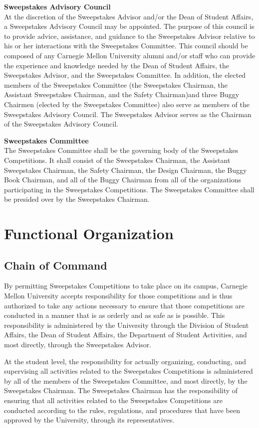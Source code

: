 \textbf{Sweepstakes Advisory Council}\\
At the discretion of the Sweepstakes Advisor and/or the Dean of Student Affairs, a Sweepstakes Advisory Council may be appointed. The purpose of this council is to provide advice, assistance, and guidance to the Sweepstakes Advisor relative to his or her interactions with the Sweepstakes Committee. This council should be composed of any Carnegie Mellon University alumni and/or staff who can provide the experience and knowledge needed by the Dean of Student Affairs, the Sweepstakes Advisor, and the Sweepstakes Committee. In addition, the elected members of the Sweepstakes Committee (the Sweepstakes Chairman, the Assistant Sweepstakes Chairman, and the Safety Chairman)and three Buggy Chairmen (elected by the Sweepstakes Committee) also serve as members of the Sweepstakes Advisory Council. The Sweepstakes Advisor serves as the Chairman of the Sweepstakes Advisory Council.

\textbf{Sweepstakes Committee}\\
The Sweepstakes Committee shall be the governing body of the Sweepstakes Competitions. It shall consist of the Sweepstakes Chairman, the Assistant Sweepstakes Chairman, the Safety Chairman, the Design Chairman, the Buggy Book Chairman, and all of the Buggy Chairman from all of the organizations participating in the Sweepstakes Competitions. The Sweepstakes Committee shall be presided over by the Sweepstakes Chairman.

\section{Functional Organization}

\subsection{Chain of Command}

By permitting Sweepstakes Competitions to take place on its campus, Carnegie Mellon University accepts responsibility for those competitions and is thus authorized to take any actions necessary to ensure that those competitions are conducted in a manner that is as orderly and as safe as is possible. This responsibility is administered by the University through the Division of Student Affairs, the Dean of Student Affairs, the Department of Student Activities, and most directly, through the Sweepstakes Advisor.

At the student level, the responsibility for actually organizing, conducting, and supervising all activities related to the Sweepstakes Competitions is administered by all of the members of the Sweepstakes Committee, and most directly, by the Sweepstakes Chairman. The Sweepstakes Chairman has the responsibility of ensuring that all activities related to the Sweepstakes Competitions are conducted according to the rules, regulations, and procedures that have been approved by the University, through its representatives.

